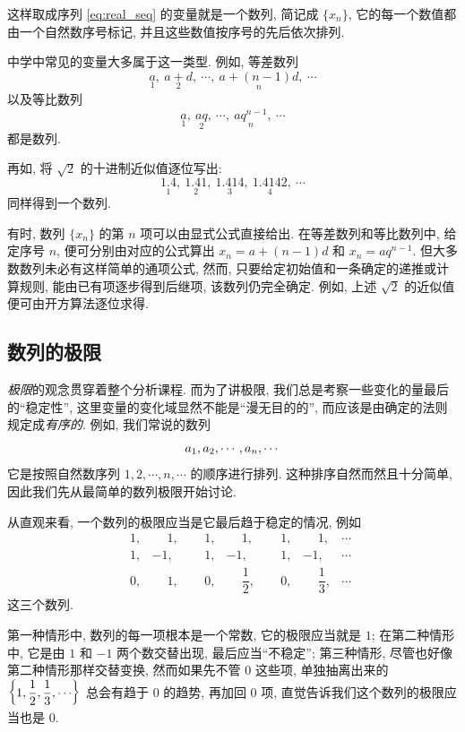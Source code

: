 这样取成序列 \eqref{eq:real_seq} 的变量就是一个数列, 简记成 $\{x_n\}$,
它的每一个数值都由一个自然数序号标记, 并且这些数值按序号的先后依次排列.

中学中常见的变量大多属于这一类型.
例如, 等差数列
$$
    \underset{1}{a},\ \underset{2}{a+d},\ \cdots,\ \underset{n}{a + (n-1)d},\ \cdots
$$
以及等比数列
$$
    \underset{1}{a},\ \underset{2}{aq},\ \cdots,\ \underset{n}{aq^{n-1}},\ \cdots
$$
都是数列.

再如, 将 $\sqrt{2}$ 的十进制近似值逐位写出:
$$
    \underset{1}{1.4},\ \underset{2}{1.41},\ \underset{3}{1.414},\ \underset{4}{1.4142},\ \cdots
$$
同样得到一个数列.

有时, 数列 $\{x_n\}$ 的第 $n$ 项可以由显式公式直接给出.
在等差数列和等比数列中, 给定序号 $n$, 便可分别由对应的公式算出 $x_n = a + (n-1)d$ 和 $x_n = aq^{n-1}$.
但大多数数列未必有这样简单的通项公式, 然而,
{\kaishu 只要给定初始值和一条确定的递推或计算规则, 能由已有项逐步得到后继项, 该数列仍完全确定.}
例如, 上述 $\sqrt{2}$ 的近似值便可由开方算法逐位求得.


\subsection{数列的极限}\label{subsec:23}

\emph{极限}的观念贯穿着整个分析课程.
而为了讲极限, 我们总是考察一些变化的量最后的“稳定性”, 这里变量的变化域显然不能是“漫无目的的”,
而应该是由确定的法则规定成\emph{有序的}.
例如, 我们常说的数列
$$
a_1, a_2, \cdots, a_{n}, \cdots
$$
它是按照自然数序列 $1, 2, \cdots, n, \cdots$ 的顺序进行排列.
这种排序自然而然且十分简单, 因此我们先从最简单的数列极限开始讨论.

从直观来看, 一个数列的极限应当是它最后趋于稳定的情况, 例如
$$
\begin{array}{ccccccc}
\phantom{-}1, & \phantom{-}1, & \phantom{-}1, & \phantom{-}1, & \phantom{-}1, & \phantom{-}1, & \cdots \\
\phantom{-}1, & -1, & \phantom{-}1, & -1, & \phantom{-}1, & -1, & \cdots \\
\phantom{-}0, & \phantom{-}1, & \phantom{-}0, & \phantom{-}\dfrac{1}{2}, & \phantom{-}0, & \phantom{-}\dfrac{1}{3}, & \cdots
\end{array}
$$
这三个数列.

第一种情形中, 数列的每一项根本是一个常数, 它的极限应当就是 $1$;
在第二种情形中, 它是由 $1$ 和 $-1$ 两个数交替出现, 最后应当“不稳定”;
第三种情形, 尽管也好像第二种情形那样交替变换,
然而如果先不管 $0$ 这些项,
单独抽离出来的 $\bbbrac{1, \dfrac{1}{2}, \dfrac{1}{3}, \cdots}$ 总会有趋于 $0$ 的趋势,
再加回 $0$ 项, 直觉告诉我们这个数列的极限应当也是 $0$.

